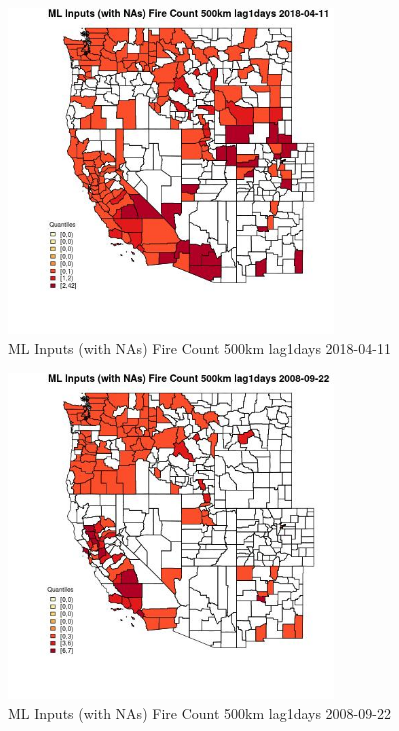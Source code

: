 \begin{figure} 
\centering  
\includegraphics[width=0.77\textwidth]{Code_Outputs/Report_ML_input_PM25_Step4_part_e_de_duplicated_aves_compiled_2019-05-18wNAs_CountyFire_Count_500km_lag1daysMean2018-04-11_2018-04-11.jpg} 
\caption{\label{fig:Report_ML_input_PM25_Step4_part_e_de_duplicated_aves_compiled_2019-05-18wNAsCountyFire_Count_500km_lag1daysMean2018-04-11_2018-04-11}ML Inputs (with NAs) Fire Count 500km lag1days 2018-04-11} 
\end{figure} 
 

\begin{figure} 
\centering  
\includegraphics[width=0.77\textwidth]{Code_Outputs/Report_ML_input_PM25_Step4_part_e_de_duplicated_aves_compiled_2019-05-18wNAs_CountyFire_Count_500km_lag1daysMean2008-09-22_2008-09-22.jpg} 
\caption{\label{fig:Report_ML_input_PM25_Step4_part_e_de_duplicated_aves_compiled_2019-05-18wNAsCountyFire_Count_500km_lag1daysMean2008-09-22_2008-09-22}ML Inputs (with NAs) Fire Count 500km lag1days 2008-09-22} 
\end{figure} 
 

